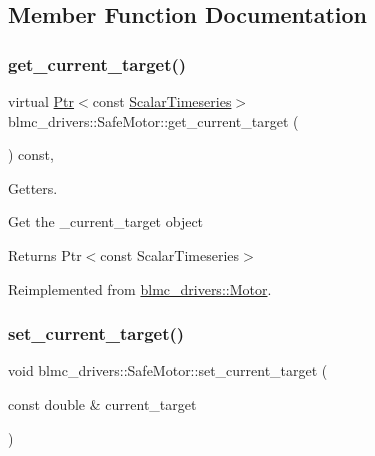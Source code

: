 \subsection{Member Function Documentation}
\mbox{\label{classblmc__drivers_1_1SafeMotor_ae40e4c51272c46f037ea0ba393b2033e}} 
\subsubsection{\texorpdfstring{get\+\_\+current\+\_\+target()}{get\_current\_target()}}
{\footnotesize\ttfamily virtual \hyperlink{classblmc__drivers_1_1MotorInterface_ae31f230b9da3674a05543023c90b124c}{Ptr}$<$const \hyperlink{classblmc__drivers_1_1MotorInterface_a49b8fc916b9f9debbd7b0988463db5cd}{Scalar\+Timeseries}$>$ blmc\+\_\+drivers\+::\+Safe\+Motor\+::get\+\_\+current\+\_\+target (\begin{DoxyParamCaption}{ }\end{DoxyParamCaption}) const\hspace{0.3cm}{\ttfamily [inline]}, {\ttfamily [virtual]}}



Getters. 

Get the \+\_\+current\+\_\+target object

\begin{DoxyReturn}{Returns}
Ptr$<$const Scalar\+Timeseries$>$ 
\end{DoxyReturn}


Reimplemented from \hyperlink{classblmc__drivers_1_1Motor_ace26e74e3c8072c8bee867a2a0a7e013}{blmc\+\_\+drivers\+::\+Motor}.

\mbox{\label{classblmc__drivers_1_1SafeMotor_adedaee24408b94b3d1ed8f856e218b12}} 
\subsubsection{\texorpdfstring{set\+\_\+current\+\_\+target()}{set\_current\_target()}}
{\footnotesize\ttfamily void blmc\+\_\+drivers\+::\+Safe\+Motor\+::set\+\_\+current\+\_\+target (\begin{DoxyParamCaption}\item[{const double \&}]{current\+\_\+target }\end{DoxyParamCaption})\hspace{0.3cm}{\ttfamily [virtual]}}



